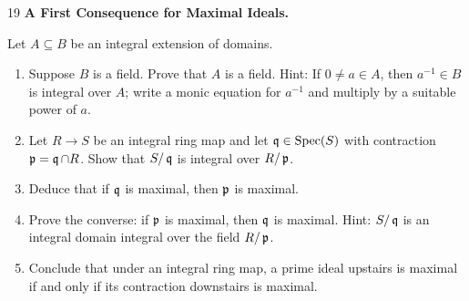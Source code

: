 \documentclass[Notebook.tex]{subfiles}
\begin{document}
\newpage

\begin{problem}{19}
    \textbf{A First Consequence for Maximal Ideals.} 
    
    Let $A\subseteq B$ be an integral extension of domains.
    \begin{enumerate}
        \item Suppose $B$ is a field. Prove that $A$ is a field. Hint: If $0\neq a\in A$, then $a^{-1}\in B$ is integral over $A$; write a monic equation for $a^{-1}$ and multiply by a suitable power of $a$.
        \item Let $R\to S$ be an integral ring map and let $\operatorname{\mathfrak{q}}\in\operatorname{Spec}(S)$ with contraction $\operatorname{\mathfrak{p}}=\operatorname{\mathfrak{q}}\cap R$. Show that $S/\operatorname{\mathfrak{q}}$ is integral over $R/\operatorname{\mathfrak{p}}$.
        \item Deduce that if $\operatorname{\mathfrak{q}}$ is maximal, then $\operatorname{\mathfrak{p}}$ is maximal.
        \item Prove the converse: if $\operatorname{\mathfrak{p}}$ is maximal, then $\operatorname{\mathfrak{q}}$ is maximal. Hint: $S/\operatorname{\mathfrak{q}}$ is an integral domain integral over the field $R/\operatorname{\mathfrak{p}}$.
        \item Conclude that under an integral ring map, a prime ideal upstairs is maximal if and only if its contraction downstairs is maximal.
    \end{enumerate}
\end{problem}
\end{document}
